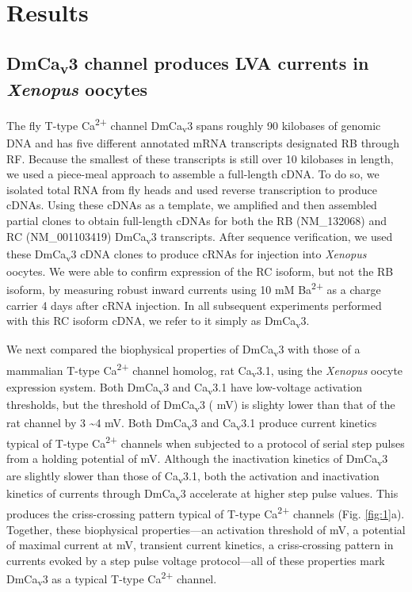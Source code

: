 \section*{Results}

\subsection*{DmCa\textsubscript{v}3 channel produces LVA currents in \emph{Xenopus} oocytes}

The fly T-type Ca\textsuperscript{2+} channel DmCa\textsubscript{v}3 spans roughly 90 kilobases of genomic DNA and has five different annotated mRNA transcripts designated RB through RF.
Because the smallest of these transcripts is still over 10 kilobases in length, we used a piece-meal approach to assemble a full-length cDNA.
To do so, we isolated total RNA from fly heads and used reverse transcription to produce cDNAs.
Using these cDNAs as a template, we amplified and then assembled partial clones to obtain full-length cDNAs for both the RB (NM_132068) and RC (NM_001103419) DmCa\textsubscript{v}3 transcripts.
After sequence verification, we used these DmCa\textsubscript{v}3 cDNA clones to produce cRNAs for injection into \emph{Xenopus} oocytes.
We were able to confirm expression of the RC isoform, but not the RB isoform, by measuring robust inward currents using 10 mM Ba\textsuperscript{2+} as a charge carrier 4 days after cRNA injection. 
In all subsequent experiments performed with this RC isoform cDNA, we refer to it simply as DmCa\textsubscript{v}3.

We next compared the biophysical properties of DmCa\textsubscript{v}3 with those of a mammalian T-type Ca\textsuperscript{2+} channel homolog, rat Ca\textsubscript{v}3.1\cite{PerezReyes:1998gn}, using the \emph{Xenopus} oocyte expression system.
Both DmCa\textsubscript{v}3 and Ca\textsubscript{v}3.1 have low-voltage activation thresholds, but the threshold of DmCa\textsubscript{v}3 ( mV) is slighty lower than that of the rat channel by 3 \sim 4 mV.
Both DmCa\textsubscript{v}3 and Ca\textsubscript{v}3.1 produce current kinetics typical of T-type Ca\textsuperscript{2+} channels when subjected to a protocol of serial step pulses from a holding potential of  mV.
Although the inactivation kinetics of DmCa\textsubscript{v}3 are slightly slower than those of Ca\textsubscript{v}3.1, both the activation and inactivation kinetics of currents through DmCa\textsubscript{v}3 accelerate at higher step pulse values. This produces the criss-crossing pattern typical of T-type Ca\textsuperscript{2+} channels (Fig. \ref{fig:1}a).
Together, these biophysical properties---an activation threshold of  mV, a potential of maximal current at  mV, transient current kinetics, a criss-crossing pattern in currents evoked by a step pulse voltage protocol---all of these properties mark DmCa\textsubscript{v}3 as a typical T-type Ca\textsuperscript{2+} channel\cite{PerezReyes:1998gn,carbone:1984aa,Cribbs:1998vc,lee:1999aa}.

